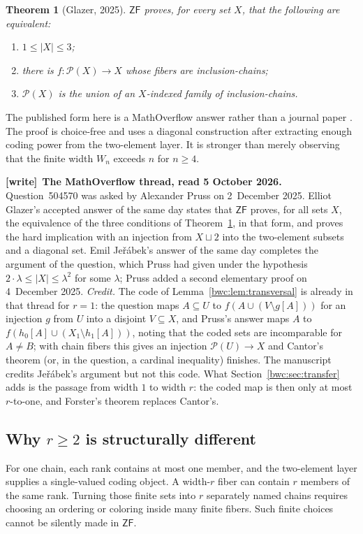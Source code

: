 \documentclass[11pt,letterpaper]{article}
\numberwithin{equation}{section}
\theoremstyle{plain}
\newtheorem{theorem}{Theorem}[section]
\theoremstyle{definition}
\theoremstyle{remark}
\newcommand{\Pow}{\mathcal P}
\newcommand{\ZF}{\mathsf{ZF}}
\newenvironment{writenote}[1][]{\par\smallskip\begingroup\small
 \noindent\textbf{[write]}\if\relax\detokenize{#1}\relax\else~\textbf{#1.}\fi\ }%
 {\par\endgroup\smallskip}
\begin{document}
\begin{theorem}[Glazer, 2025]\label{bwc:thm:glazer}
$\ZF$ proves, for every set $X$, that the following are equivalent:
\begin{enumerate}
\item $1\leq|X|\leq3$;
\item there is $f:\Pow(X)\to X$ whose fibers are inclusion-chains;
\item $\Pow(X)$ is the union of an $X$-indexed family of inclusion-chains.
\end{enumerate}
\end{theorem}

The published form here is a MathOverflow answer rather than a journal paper
\cite{PrussGlazer2025}.  The proof is choice-free and uses a diagonal
construction after extracting enough coding power from the two-element layer.
It is stronger than merely observing that the finite width $W_n$ exceeds $n$
for $n\geq4$.

\begin{writenote}[The MathOverflow thread, read 5 October 2026]
Question~504570 was asked by Alexander Pruss on 2~December 2025. Elliot
Glazer's accepted answer of the same day states that $\ZF$ proves, for all sets
$X$, the equivalence of the three conditions of
Theorem~\ref{bwc:thm:glazer}, in that form, and proves the hard implication
with an injection from $X\sqcup2$ into the two-element subsets and a
diagonal set. Emil Je\v{r}\'abek's answer of the same day completes the
argument of the question, which Pruss had given under the hypothesis
$2\cdot\lambda\leq|X|\leq\lambda^2$ for some $\lambda$; Pruss added a second
elementary proof on 4~December 2025. \emph{Credit.} The code of
Lemma~\ref{bwc:lem:transversal} is already in that thread for $r=1$: the
question maps $A\subseteq U$ to $f(A\cup(V\setminus g[A]))$ for an injection
$g$ from $U$ into a disjoint $V\subseteq X$, and Pruss's answer maps $A$ to
$f(h_0[A]\cup(X_1\setminus h_1[A]))$, noting that the coded sets are
incomparable for $A\neq B$; with chain fibers this gives an injection
$\Pow(U)\to X$ and Cantor's theorem (or, in the question, a cardinal
inequality) finishes. The manuscript credits Je\v{r}\'abek's argument but not
this code. What Section~\ref{bwc:sec:transfer} adds is the passage from width
$1$ to width $r$: the coded map is then only at most $r$-to-one, and
Forster's theorem replaces Cantor's.
\end{writenote}

\subsection{Why \texorpdfstring{$r\geq2$}{r >= 2} is structurally different}
For one chain, each rank contains at most one member, and the two-element
layer supplies a single-valued coding object.  A width-$r$ fiber can contain
$r$ members of the same rank.  Turning those finite sets into $r$ separately
named chains requires choosing an ordering or coloring inside many finite
fibers.  Such finite choices cannot be silently made in $\ZF$.
\end{document}
